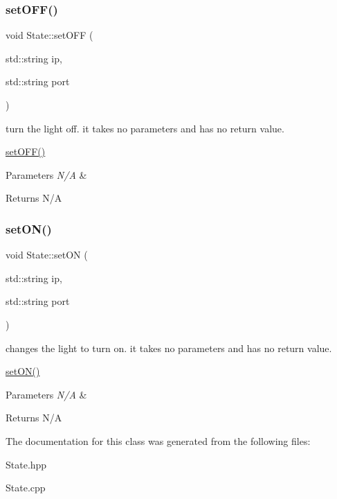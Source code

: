 \subsubsection{\texorpdfstring{set\+O\+F\+F()}{setOFF()}}
{\footnotesize\ttfamily void State\+::set\+O\+FF (\begin{DoxyParamCaption}\item[{std\+::string}]{ip,  }\item[{std\+::string}]{port }\end{DoxyParamCaption})}



turn the light off. it takes no parameters and has no return value. 

\hyperlink{class_state_af2ff926d083755dc5c0efe8c115817b6}{set\+O\+F\+F()} 
\begin{DoxyParams}{Parameters}
{\em N/A} & \\
\hline
\end{DoxyParams}
\begin{DoxyReturn}{Returns}
N/A 
\end{DoxyReturn}
\mbox{\label{class_state_a01a82c054b5a252942247dd89fc0aabe}} 
\subsubsection{\texorpdfstring{set\+O\+N()}{setON()}}
{\footnotesize\ttfamily void State\+::set\+ON (\begin{DoxyParamCaption}\item[{std\+::string}]{ip,  }\item[{std\+::string}]{port }\end{DoxyParamCaption})}



changes the light to turn on. it takes no parameters and has no return value. 

\hyperlink{class_state_a01a82c054b5a252942247dd89fc0aabe}{set\+O\+N()} 
\begin{DoxyParams}{Parameters}
{\em N/A} & \\
\hline
\end{DoxyParams}
\begin{DoxyReturn}{Returns}
N/A 
\end{DoxyReturn}


The documentation for this class was generated from the following files\+:\begin{DoxyCompactItemize}
\item 
State.\+hpp\item 
State.\+cpp\end{DoxyCompactItemize}
